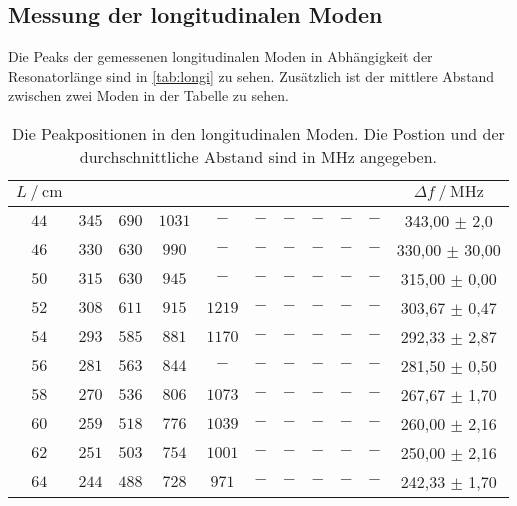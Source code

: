 \subsection{Messung der longitudinalen Moden}
\label{sec:Stab_be}
Die Peaks der gemessenen longitudinalen Moden in Abhängigkeit der Resonatorlänge sind in \autoref{tab:longi} zu sehen.
Zusätzlich ist der mittlere Abstand zwischen zwei Moden in der Tabelle zu sehen.

\begin{table}[H]
    \centering
    \caption{Die Peakpositionen in den longitudinalen Moden. Die Postion und der durchschnittliche Abstand sind in $\unit{\mega\hertz}$ angegeben.}
    \label{tab:longi}
    \begin{tabular}{c c c c c c c c c c | S[table-format=3.2]}
    \toprule
      $L \mathbin{/} \unit{\centi\meter}$ & & & & & & & & & & $\Delta f \mathbin{/}  \unit{\mega\hertz}$   \\
    \midrule
        $44$ &  $345$ & $690$ &$ 1031$ & $-   $ & $-    $ & $-   $ & $-   $ & $-   $ &  $-   $ &   {343,00 $\pm$ 2,0}  \\
        $46$ &  $330$ & $630$ &$ 990$  & $-   $ & $-    $ & $-   $ & $-   $ & $-   $ &  $-   $ &   {330,00 $\pm$ 30,00} \\
        $50$ &  $315$ & $630$ &$ 945$  & $-   $ & $-    $ & $-   $ & $-   $ & $-   $ &  $-   $ &   {315,00 $\pm$ 0,00}  \\
        $52$ &  $308$ & $611$ &$ 915$  & $1219$ & $-    $ & $-   $ & $-   $ & $-   $ &  $-   $ &   {303,67 $\pm$ 0,47}  \\
        $54$ &  $293$ & $585$ &$ 881$  & $1170$ & $-    $ & $-   $ & $-   $ & $-   $ &  $-   $ &   {292,33 $\pm$ 2,87}  \\
        $56$ &  $281$ & $563$ &$ 844$  & $-   $ & $-    $ & $-   $ & $-   $ & $-   $ &  $-   $ &   {281,50 $\pm$ 0,50}  \\
        $58$ &  $270$ & $536$ &$ 806$  & $1073$ & $-    $ & $-   $ & $-   $ & $-   $ &  $-   $ &   {267,67 $\pm$ 1,70}  \\
        $60$ &  $259$ & $518$ &$ 776$  & $1039$ & $-    $ & $-   $ & $-   $ & $-   $ &  $-   $ &   {260,00 $\pm$ 2,16}  \\
        $62$ &  $251$ & $503$ &$ 754$  & $1001$ & $-    $ & $-   $ & $-   $ & $-   $ &  $-   $ &   {250,00 $\pm$ 2,16}  \\
        $64$ &  $244$ & $488$ &$ 728$  & $971 $ & $-    $ & $-   $ & $-   $ & $-   $ &  $-   $ &   {242,33 $\pm$ 1,70}  \\

\end{tabular}
\end{table}
